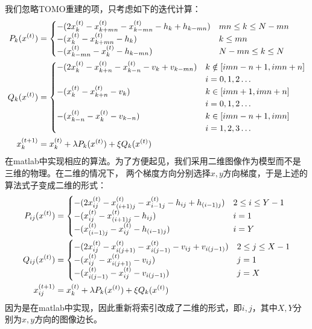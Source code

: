 我们忽略TOMO重建的项，只考虑如下的迭代计算：
\begin{align*}
P_k(x^{(t)}) &= \begin{cases}
                            -(2x_k^{(t)} - x_{k+mn}^{(t)} - x_{k-mn}^{(t)} - h_k + h_{k-mn}) & mn \le k \le N-mn \\
                            -(x_k^{(t)} - x_{k+mn}^{(t)} - h_k) &  k\le mn \\
                            -(x_{k-mn}^{(t)} - x_{k}^{(t)} - h_{k-mn}) &  N-mn \le k \le N
                        \end{cases}   \\
Q_k(x^{(t)}) &= \begin{cases}
                            -(2x_k^{(t)} - x_{k+n}^{(t)} - x_{k-n}^{(t)} - v_k + v_{k-mn}) & k \notin [ imn-n+1, imn+n]
                            \\ &i = 0,1,2\hdots\\
                            -(x_k^{(t)} - x_{k+n}^{(t)} - v_k) & k \in \left[imn+1,imn+n\right] \\ &i = 0,1,2\hdots\\
                            -(x_{k-n}^{(t)} - x_{k}^{(t)} - v_{k-n}) &  k \in [imn-n+1,imn] \\ &i= 1,2,3 \hdots
                        \end{cases}  \\
x_k^{(t+1)}&= x_k^{(t)} + \lambda P_k(x^{(t)}) + \xi Q_k(x^{(t)})
\end{align*}
在matlab中实现相应的算法。为了方便起见，我们采用二维图像作为模型而不是三维的物理。在二维的情况下，
两个梯度方向分别选择$x,y$方向梯度，于是上述的算法式子变成二维的形式：
\begin{align*}
P_{ij}(x^{(t)}) &= \begin{cases}
                            -(2x_{ij}^{(t)} - x_{(i+1)j}^{(t)} - x_{{i-1}j}^{(t)} - h_{ij} + h_{(i-1)j}) & 2 \le i \le Y-1 \\
                            -(x_{ij}^{(t)} - x_{(i+1)j}^{(t)} - h_{ij}) &  i = 1 \\
                            -(x_{(i-1)j}^{(t)} - x_{ij}^{(t)} - h_{(i-1)j}) &  i = Y
                        \end{cases}   \\
Q_{ij}(x^{(t)}) &= \begin{cases}
                            -(2x_{ij}^{(t)} - x_{i(j+1)}^{(t)} - x_{i(j-1)}^{(t)} - v_{ij} + v_{i(j-1)}) & 2 \le j \le X-1\\
                            -(x_{ij}^{(t)} - x_{i(j+1)}^{(t)} - v_{ij}) &  j = 1 \\
                            -(x_{i(j-1)}^{(t)} - x_{ij}^{(t)} - v_{i(j-1)}) &  j = X
                        \end{cases}  \\
x_{ij}^{(t+1)}&= x_k^{(t)} + \lambda P_k(x^{(t)}) + \xi Q_k(x^{(t)})
\end{align*}
因为是在matlab中实现，因此重新将索引改成了二维的形式，即$i,j$，其中$X,Y$分别为$x,y$方向的图像边长。

